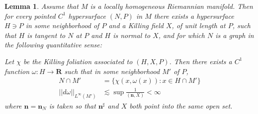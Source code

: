 \documentclass[reqno,12pt,letterpaper]{amsart}
\newcommand{\RR}{\mathbf{R}}
\newcommand{\normal}{\mathbf n}
\newtheorem{lemma}[theorem]{Lemma}
\theoremstyle{definition}
\numberwithin{equation}{section}
\begin{document}
\begin{lemma}\label{hopfKilling}
Assume that $M$ is a locally homogeneous Riemannian manifold.
Then for every pointed $C^1$ hypersurface $(N, P)$ in $M$ there exists a hypersurface $H \ni P$ in some neighborhood of $P$ and a Killing field $X$, of unit length at $P$, such that $H$ is tangent to $N$ at $P$ and $H$ is normal to $X$, and for which $N$ is a graph in the following quantitative sense:

Let $\chi$ be the Killing foliation associated to $(H, X, P)$.
Then there exists a $C^1$ function $\omega: H \to \RR$ such that in some neighborhood $M'$ of $P$,
\begin{align}
N \cap M' &= \{\chi(x, \omega(x)): x \in H \cap M'\} \label{N is a graph}\\
||d\omega||_{L^\infty(M')} &\lesssim \sup \frac{1}{(\normal, X)} < \infty \label{derivative bounds}
\end{align}
where $\normal = \normal_N$ is taken so that $\normal^\sharp$ and $X$ both point into the same open set.
\end{lemma}
\end{document}
